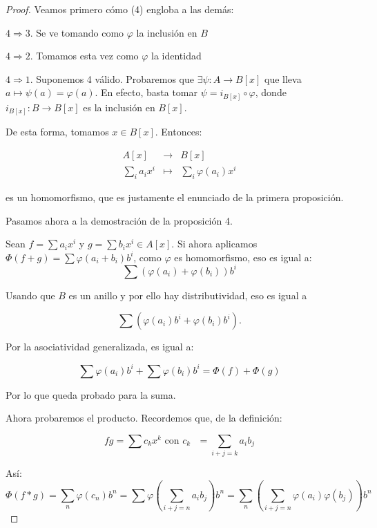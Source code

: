 \begin{proof}
Veamos primero cómo (4) engloba a las demás:
\begin{nlist}

\item $4 \Rightarrow 3$. Se ve tomando como $\varphi$ la inclusión en $B$
\item $4 \Rightarrow 2$. Tomamos esta vez como $\varphi$ la identidad
\item $4 \Rightarrow 1$. Suponemos 4 válido. Probaremos que $\exists\psi: A \to B[x]$ que lleva $a \mapsto \psi(a) = \varphi(a)$.
  En efecto, basta tomar $\psi = i_{B[x]} \circ \varphi$, donde $i_{B[x]} : B \to B[x]$ es la inclusión en $B[x]$.


De esta forma, tomamos $x\in B[x]$. Entonces:

\[
\begin{array}{lll}

  A[x] & \to & B[x] \\
  \sum_i a_i x^i & \mapsto & \sum_i \varphi(a_i)x^i
\end{array}
\]

es un homomorfismo, que es justamente el enunciado de la primera proposición.

\end{nlist}

Pasamos ahora a la demostración de la proposición 4.


Sean $f = \sum a_i x^i$ y $g = \sum b_i x^i \in A[x]$.
Si ahora aplicamos $\Phi(f+g) = \sum \varphi(a_i + b_i)b^i$, como $\varphi$ es homomorfismo, eso es igual a:
\[
    \sum (\varphi(a_i) + \varphi(b_i))b^i
\]

Usando que $B$ es un anillo y por ello hay distributividad, eso es igual a

\[
    \sum (\varphi(a_i)b^i + \varphi(b_i)b^i).
\]

Por la asociatividad generalizada, es igual a:

\[
\sum \varphi(a_i)b^i + \sum \varphi(b_i)b^i = \Phi(f) + \Phi(g)
\]

Por lo que queda probado para la suma.

Ahora probaremos el producto. Recordemos que, de la definición:

\[
fg = \sum c_k x^k \text{ con $c_k$ }  = \sum_{i+j = k} a_ib_j
\]

 Así: \[\Phi(f*g) = \sum_n\varphi(c_n)b^n = \sum \varphi\left(\sum_{i+j = n} a_ib_j\right)b^n = \sum_n \left( \sum_{i+j = n} \varphi(a_i)\varphi(b_j)\right)b^n\]


\end{proof}
